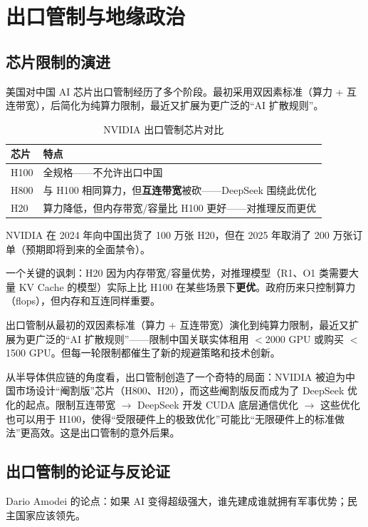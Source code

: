 \section{出口管制与地缘政治}

\subsection{芯片限制的演进}

美国对中国 AI 芯片出口管制经历了多个阶段。最初采用双因素标准（算力 + 互连带宽），后简化为纯算力限制，最近又扩展为更广泛的``AI 扩散规则''。

\begin{table}[H]
\centering
\begin{tabular}{lp{8cm}}
\toprule
\textbf{芯片} & \textbf{特点} \\
\midrule
H100 & 全规格——不允许出口中国 \\
H800 & 与 H100 相同算力，但\textbf{互连带宽}被砍——DeepSeek 围绕此优化 \\
H20 & 算力降低，但内存带宽/容量比 H100 更好——对推理反而更优 \\
\bottomrule
\end{tabular}
\caption{NVIDIA 出口管制芯片对比}
\end{table}

NVIDIA 在 2024 年向中国出货了 100 万张 H20，但在 2025 年取消了 200 万张订单（预期即将到来的全面禁令）。

一个关键的讽刺：H20 因为内存带宽/容量优势，对推理模型（R1、O1 类需要大量 KV Cache 的模型）实际上比 H100 在某些场景下\textbf{更优}。政府历来只控制算力（flops），但内存和互连同样重要。

出口管制从最初的双因素标准（算力 + 互连带宽）演化到纯算力限制，最近又扩展为更广泛的``AI 扩散规则''——限制中国关联实体租用 $<$2000 GPU 或购买 $<$1500 GPU。但每一轮限制都催生了新的规避策略和技术创新。

从半导体供应链的角度看，出口管制创造了一个奇特的局面：NVIDIA 被迫为中国市场设计``阉割版''芯片（H800、H20），而这些阉割版反而成为了 DeepSeek 优化的起点。限制互连带宽 $\to$ DeepSeek 开发 CUDA 底层通信优化 $\to$ 这些优化也可以用于 H100，使得``受限硬件上的极致优化''可能比``无限硬件上的标准做法''更高效。这是出口管制的意外后果。

\subsection{出口管制的论证与反论证}

Dario Amodei 的论点：如果 AI 变得超级强大，谁先建成谁就拥有军事优势；民主国家应该领先。


